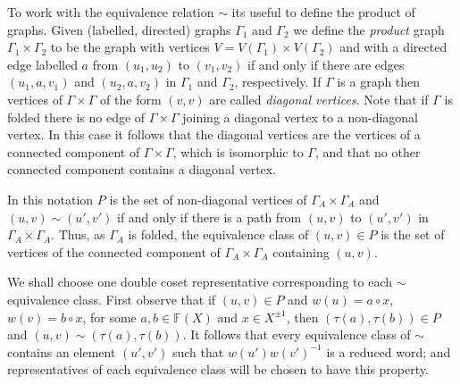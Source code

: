 \documentclass[a4paper,12pt]{article}
\newcommand{\G}{\Gamma }
\renewcommand{\t}{\tau }
\numberwithin{equation}{section}
\numberwithin{figure}{section}
\newcommand{\FF}{\ensuremath{\mathbb{F}}}
\begin{document}
To work with the equivalence relation $\sim$ its useful to define
the product of graphs. Given (labelled, directed)
graphs $\G_1$ and $\G_2$ we define the {\em
product} graph $\G_1\times \G_2$ to be the graph with vertices
$V=V(\G_1)\times V(\G_2)$ and with a directed edge labelled $a$
from $(u_1,u_2)$ to $(v_1,v_2)$ if and only if there are edges
$(u_1,a, v_1)$ and $(u_2,a,v_2)$ in $\G_1$ and $\G_2$,
respectively. If $\G$ is a graph then
vertices of $\G\times \G$ of
 the form $(v,v)$ are called {\em diagonal vertices}.
Note that if $\G$ is folded there is no edge of $\G\times \G$
joining a diagonal vertex to a non-diagonal vertex. In this case
it follows that the diagonal vertices are the vertices of a
connected component of $\G\times \G$, which is isomorphic to $\G$,
and that no other connected component contains a diagonal vertex.

In this notation $P$ is the set of non-diagonal vertices of
$\G_A\times \G_A$ and $(u,v)\sim (u',v')$ if and only if there is
a path from $(u,v)$ to $(u',v')$ in $\G_A\times \G_A$.
 Thus, as $\G_A$ is folded, the equivalence class of $(u,v)\in P$
is the set of vertices of the connected component of $\G_A\times \G_A$
containing $(u,v)$.

We shall choose one double coset representative corresponding to
each $\sim$ equivalence class. First observe that if
$(u,v)\in P$ and $w(u)=a\circ x$, $w(v)=b\circ x$, for some
$a,b\in \FF(X)$ and $x\in X^{\pm 1}$, then $(\t(a),\t(b))\in P$ and
$(u,v)\sim (\t(a),\t(b))$. It follows that every equivalence  class
of $\sim$ contains an element $(u',v')$ such that
$w(u')w(v')^{-1}$ is a reduced word; and representatives of each
equivalence class will be chosen to have this property.
\end{document}
